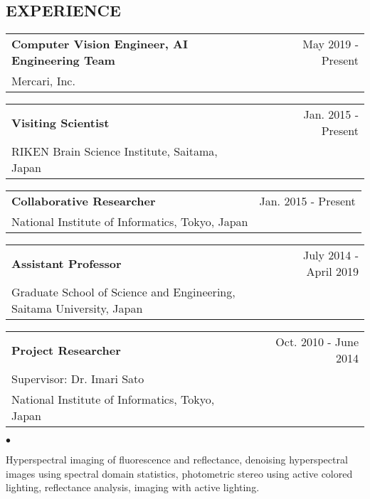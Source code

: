 \documentclass[letterpaper,10pt]{article}
\newenvironment{smallitemize}{
  \begin{list}{$\bullet$}{
    \setlength{\leftmargin}{3.5em}
        \setlength{\topmargin}{-1.0em}
    \setlength{\itemsep}{-0.10em}
    \setlength{\parskip}{-0.8em}
    \setlength{\parsep}{0.10em}
  }
}{
  \end{list}
}
\renewcommand{\bf}{\bfseries}
\begin{document}
\subsection*{EXPERIENCE}
\begin{tabularx}{\textwidth}{b{}r}
        \bf{Computer Vision Engineer, AI Engineering Team} & May 2019 - Present {} \\
        {Mercari, Inc.} & {} \\
\end{tabularx}
\begin{tabularx}{\textwidth}{b{}r}
        \bf{Visiting Scientist} & Jan. 2015 - Present {} \\
        {RIKEN Brain Science Institute, Saitama, Japan} & {} \\
\end{tabularx}
\begin{tabularx}{\textwidth}{b{}r}
        \bf{Collaborative Researcher} & Jan. 2015 - Present {} \\
        {National Institute of Informatics, Tokyo, Japan} & {} \\
\end{tabularx}
\begin{tabularx}{\textwidth}{b{}r}
        \bf{Assistant Professor} & July 2014 - April 2019 {} \\
        {Graduate School of Science and Engineering, Saitama University,
Japan} & {} \\
\end{tabularx}
\begin{tabularx}{\textwidth}{b{}r}
        \bf{Project Researcher} & Oct. 2010 - June 2014 {} \\
        Supervisor: Dr. Imari Sato & {} \\
        {National Institute of Informatics, Tokyo, Japan} & {} \\
\end{tabularx}
\begin{smallitemize} \normalfont
        \item Hyperspectral imaging of fluorescence and reflectance, denoising hyperspectral images using spectral domain statistics, photometric stereo using active colored lighting, reflectance analysis, imaging with active lighting.
\end{smallitemize}
\end{document}
